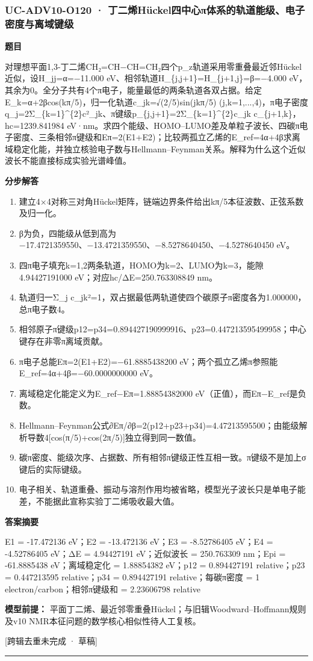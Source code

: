 \documentclass[UTF8,11pt,a4paper]{ctexart}
\begin{document}
\subsubsection*{UC-ADV10-O120 · 丁二烯Hückel四中心π体系的轨道能级、电子密度与离域键级}
\noindent\textbf{题目}\par
对理想平面1,3-丁二烯CH₂=CH−CH=CH₂四个p\_z轨道采用零重叠最近邻Hückel近似，设H\_jj=α=−11.000 eV、相邻轨道H\_\{j,j+1\}=H\_\{j+1,j\}=β=−4.000 eV，其余为0。全分子共有4个π电子，能量最低的两条轨道各双占据。给定E\_k=α+2βcos(kπ/5)，归一化轨道c\_jk=√(2/5)sin(jkπ/5) (j,k=1,...,4)，π电子密度q\_j=2Σ\_\{k=1\}\textasciicircum{}\{2\}c²\_jk、π键级p\_\{j,j+1\}=2Σ\_\{k=1\}\textasciicircum{}\{2\}c\_jk c\_\{j+1,k\}，hc=1239.841984 eV·nm。求四个能级、HOMO–LUMO差及单粒子波长、四碳π电子密度、三条相邻π键级和Eπ=2(E1+E2)；比较两孤立乙烯的E\_ref=4α+4β求离域稳定化能，并独立核验电子数与Hellmann–Feynman关系。解释为什么这个近似波长不能直接标成实验光谱峰值。\par
\medskip\noindent\textbf{分步解答}
\begin{enumerate}
\item 建立4×4对称三对角Hückel矩阵，链端边界条件给出kπ/5本征波数、正弦系数及归一化。
\item β为负，四能级从低到高为−17.4721359550、−13.4721359550、−8.5278640450、−4.5278640450 eV。
\item 四π电子填充k=1,2两条轨道，HOMO为k=2、LUMO为k=3，能隙4.94427191000 eV；对应hc/ΔE=250.763308849 nm。
\item 轨道归一Σ\_j c\_jk²=1，双占据最低两轨道使四个碳原子π密度各为1.000000，总π电子数4。
\item 相邻原子π键级p12=p34=0.894427190999916、p23=0.447213595499958；中心键存在非零π离域贡献。
\item π电子总能Eπ=2(E1+E2)=−61.8885438200 eV；两个孤立乙烯π参照能E\_ref=4α+4β=−60.0000000000 eV。
\item 离域稳定化能定义为E\_ref−Eπ=1.88854382000 eV（正值），而Eπ−E\_ref是负数。
\item Hellmann–Feynman公式∂Eπ/∂β=2(p12+p23+p34)=4.47213595500；由能级解析导数4[cos(π/5)+cos(2π/5)]独立得到同一数值。
\item 碳π密度、能级次序、占据数、所有相邻π键级正性互相一致。π键级不是加上σ键后的实际键级。
\item 电子相关、轨道重叠、振动与溶剂作用均被省略，模型光子波长只是单电子能差，不能据此宣称实验丁二烯吸收最大值。
\end{enumerate}
\noindent\textbf{答案摘要}\par
E1 = -17.472136 eV；E2 = -13.472136 eV；E3 = -8.52786405 eV；E4 = -4.52786405 eV；ΔE = 4.94427191 eV；近似波长 = 250.763309 nm；Epi = -61.8885438 eV；离域稳定化 = 1.88854382 eV；p12 = 0.894427191 relative；p23 = 0.447213595 relative；p34 = 0.894427191 relative；每碳π密度 = 1 electron/carbon；相邻π键级和 = 2.23606798 relative\par
\noindent\textbf{模型前提：}
平面丁二烯、最近邻零重叠Hückel；与旧辑Woodward–Hoffmann规则及v10 NMR本征问题的数学核心相似性待人工复核。\par
\noindent\textcolor{red!65!black}{[跨辑去重未完成 · 草稿]} \par
\medskip\hrule\medskip
{}
\end{document}
